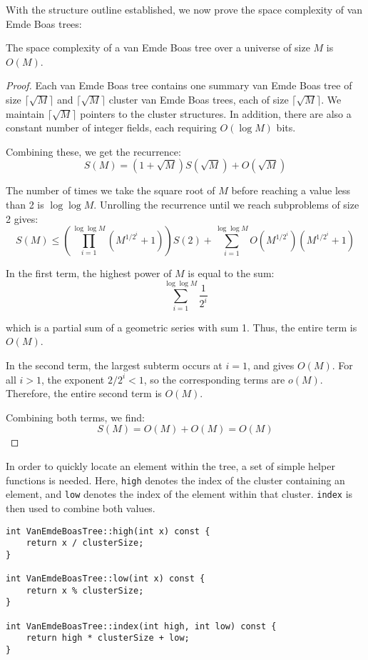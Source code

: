 With the structure outline established, we now prove the space complexity of van Emde Boas trees: 
\begin{lemma}
The space complexity of a van Emde Boas tree over a universe of size \( M \) is \( O(M) \).
\end{lemma}

\begin{proof}
Each van Emde Boas tree contains one summary van Emde Boas tree of size \(\lceil \sqrt{M} \rceil\) and \(\lceil \sqrt{M} \rceil\) cluster van Emde Boas trees, each of size \(\lceil \sqrt{M} \rceil\). We maintain \(\lceil \sqrt{M} \rceil\) pointers to the cluster structures. In addition, there are also a constant number of integer fields, each requiring \(O(\log M)\) bits.

Combining these, we get the recurrence:
\[
S(M) = (1 + \sqrt{M}) S(\sqrt{M}) + O(\sqrt{M})
\]

The number of times we take the square root of \(M\) before reaching a value less than 2 is \(\log \log M\). Unrolling the recurrence until we reach subproblems of size 2 gives:
\[
S(M) \leq \left( \prod_{i=1}^{\log \log M} \left( M^{1/2^i} + 1 \right) \right) S(2) + \sum_{i=1}^{\log \log M} O\left( M^{1/2^i} \right) \left( M^{1/2^i} + 1 \right)
\]

In the first term, the highest power of \(M\) is equal to the sum:
\[
\sum_{i=1}^{\log \log M} \frac{1}{2^i}
\]

which is a partial sum of a geometric series with sum 1. Thus, the entire term is \(O(M)\).

In the second term, the largest subterm occurs at \(i = 1\), and gives \(O(M)\). For all \(i > 1\), the exponent \(2/2^i < 1\), so the corresponding terms are \(o(M)\). Therefore, the entire second term is \(O(M)\).

Combining both terms, we find:
\[
S(M) = O(M) + O(M) = O(M)
\]
\end{proof}

In order to quickly locate an element within the tree, a set of simple helper functions is needed. Here, \texttt{high} denotes the index of the cluster containing an element, and \texttt{low} denotes the index of the element within that cluster. \texttt{index} is then used to combine both values.

\begin{verbatim}
int VanEmdeBoasTree::high(int x) const {
    return x / clusterSize;
}

int VanEmdeBoasTree::low(int x) const {
    return x % clusterSize;
}

int VanEmdeBoasTree::index(int high, int low) const {
    return high * clusterSize + low;
}
\end{verbatim}

